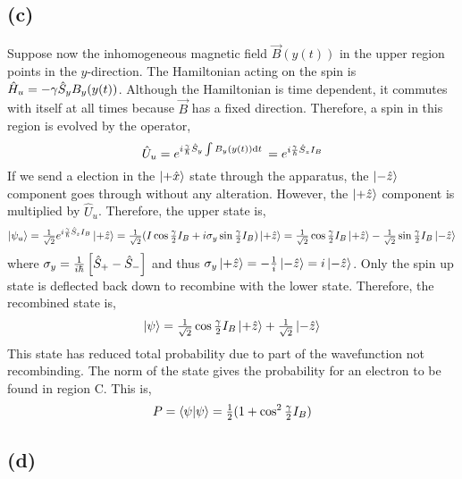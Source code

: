 \documentclass[12pt]{extarticle}
\begin{document}
\subsection*{(c)}

Suppose now the inhomogeneous magnetic field $\vec{B}(y(t))$ in the upper region points in the $y$-direction. The Hamiltonian acting on the spin is $\hamilt_u = - \gamma \S_y B_y(y(t))$. Although the Hamiltonian is time dependent, it commutes with itself at all times because $\vec{B}$ has a fixed direction. Therefore, a spin in this region is evolved by the operator, 
\[\hat{U}_u = e^{i \frac{\gamma}{\hbar} \S_y \int B_y(y(t)) \d{t}} = e^{i \frac{\gamma}{\hbar} \S_z I_B} \] 
If we send a election in the $\ket{+ \hat{x}}$ state through the apparatus, the $\ket{-\hat{z}}$ component goes through without any alteration. However, the $\ket{+ \hat{z}}$ component is multiplied by $\hat{U}_u$. Therefore, the upper state is,
\[\ket{\psi_u} = \tfrac{1}{\sqrt{2}} e^{i \frac{\gamma}{\hbar} \S_z I_B} \ket{+ \hat{z}}  = \tfrac{1}{\sqrt{2}} (I \cos{\tfrac{\gamma}{2} I_B} + i \sigma_y \sin{\tfrac{\gamma}{2} I_B}) \ket{+ \hat{z}} = \tfrac{1}{\sqrt{2}} \cos{\tfrac{\gamma}{2} I_B} \ket{+ \hat{z}} - \tfrac{1}{\sqrt{2}} \sin{\tfrac{\gamma}{2} I_B} \ket{- \hat{z}} \]
where $\sigma_y = \tfrac{1}{i \hbar} \left[\S_{+} - \S_{-} \right]$ and thus $\sigma_y \ket{+ \hat{z}} = - \frac{1}{i} \ket{- \hat{z}} = i \ket{- \hat{z}}$. Only the spin up state is deflected back down to recombine with the lower state. Therefore, the recombined state is,
\[\ket{\psi} = \tfrac{1}{\sqrt{2}} \cos{\tfrac{\gamma}{2} I_B} \ket{+\hat{z}} + \tfrac{1}{\sqrt{2}} \ket{-\hat{z}} \] 
This state has reduced total probability due to part of the wavefunction not recombinding. The norm of the state gives the probability for an electron to be found in region C. This is,
\[P = \inner{\psi}{\psi} = \tfrac{1}{2}(1 + \cos^2{\tfrac{\gamma}{2}I_B})\]  

\subsection*{(d)}
\end{document}
